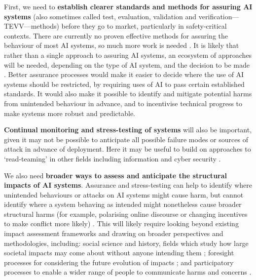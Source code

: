 \documentclass{article}
\begin{document}
First, we need to \textbf{establish clearer standards and methods for assuring AI systems} (also sometimes called test, evaluation, validation and verification---TEVV---methods) before they go to market, particularly in safety-critical contexts. There are currently no proven effective methods for assuring the behaviour of most AI systems, so much more work is needed \citep{flournoy_building_2020}. It is likely that rather than a single approach to assuring AI systems, an ecosystem of approaches will be needed, depending on the type of AI system, and the decision to be made \citep{ahamat_types_2021}. Better assurance processes would make it easier to decide where the use of AI systems should be restricted, by requiring uses of AI to pass certain established standards. It would also make it possible to identify and mitigate potential harms from unintended behaviour in advance, and to incentivise technical progress to make systems more robust and predictable.


\textbf{Continual monitoring and stress-testing of systems }will also be important, given it may not be possible to anticipate all possible failure modes or sources of attack in advance of deployment. Here it may be useful to build on approaches to ‘read-teaming’ in other fields including information and cyber security  \citep{brundage_malicious_2018}.


We also need \textbf{broader ways to assess and anticipate the structural impacts of AI systems}. Assurance and stress-testing can help to identify where unintended behaviours or attacks on AI systems might cause harm, but cannot identify where a system behaving as intended might nonetheless cause broader structural harms (for example, polarising online discourse or changing incentives to make conflict more likely)  \citep{zwetsloot_thinking_2019}. This will likely require looking beyond existing impact assessment frameworks and drawing on broader perspectives and methodologies, including: social science and history, fields which study how large societal impacts may come about without anyone intending them  \citep{zwetsloot_thinking_2019}; foresight processes for considering the future evolution of impacts \citep{noauthor_government_2017}; and participatory processes to enable a wider range of people to communicate harms and concerns  \citep{smith_our_2019}.
\end{document}
